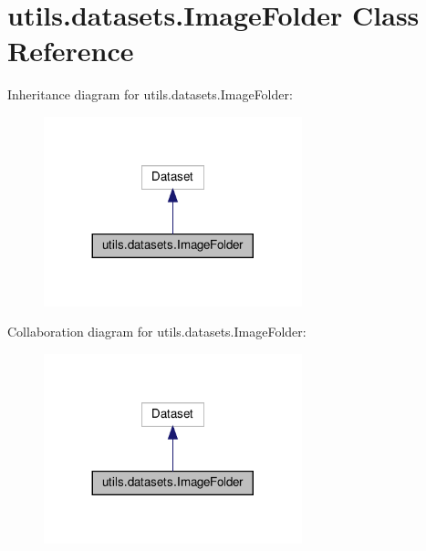 \hypertarget{classutils_1_1datasets_1_1ImageFolder}{}\section{utils.\+datasets.\+Image\+Folder Class Reference}
\label{classutils_1_1datasets_1_1ImageFolder}


Inheritance diagram for utils.\+datasets.\+Image\+Folder\+:
\nopagebreak
\begin{figure}[H]
\begin{center}
\leavevmode
\includegraphics[width=212pt]{classutils_1_1datasets_1_1ImageFolder__inherit__graph}
\end{center}
\end{figure}


Collaboration diagram for utils.\+datasets.\+Image\+Folder\+:
\nopagebreak
\begin{figure}[H]
\begin{center}
\leavevmode
\includegraphics[width=212pt]{classutils_1_1datasets_1_1ImageFolder__coll__graph}
\end{center}
\end{figure}
